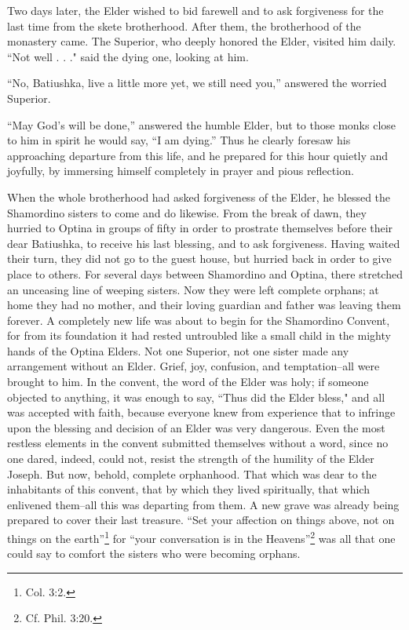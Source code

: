 Two days later, the Elder wished to bid farewell and to ask forgiveness for the last time from the skete brotherhood. After them, the brotherhood of the monastery came. The Superior, who deeply honored the Elder, visited him daily. “Not well . . ." said the dying one, looking at him.

“No, Batiushka, live a little more yet, we still need you,” answered the worried Superior.

“May God's will be done,” answered the humble Elder, but to those monks close to him in spirit he would say, “I am dying.” Thus he clearly foresaw his approaching departure from this life, and he prepared for this hour quietly and joyfully, by immersing himself completely in prayer and pious reflection.

When the whole brotherhood had asked forgiveness of the Elder, he blessed the Shamordino sisters to come and do likewise. From the break of dawn, they hurried to Optina in groups of fifty in order to prostrate themselves before their dear Batiushka, to receive his last blessing, and to ask forgiveness. Having waited their turn, they did not go to the guest house, but hurried back in order to give place to others. For several days between Shamordino and Optina, there stretched an unceasing line of weeping sisters. Now they were left complete orphans; at home they had no mother, and their loving guardian and father was leaving them forever. A completely new life was about to begin for the Shamordino Convent, for from its foundation it had rested untroubled like a small child in the mighty hands of the Optina Elders. Not one Superior, not one sister made any arrangement without an Elder. Grief, joy, confusion, and temptation--all were brought to him. In the convent, the word of the Elder was holy; if someone objected to anything, it was enough to say, “Thus did the Elder bless," and all was accepted with faith, because everyone knew from experience that to infringe upon the blessing and decision of an Elder was very dangerous. Even the most restless elements in the convent submitted themselves without a word, since no one dared, indeed, could not, resist the strength of the humility of the Elder Joseph. But now, behold, complete orphanhood. That which was dear to the inhabitants of this convent, that by which they lived spiritually, that which enlivened them--all this was departing from them. A new grave was already being prepared to cover their last treasure. “Set your affection on things above, not on things on the earth''\footnote{Col. 3:2.} for “your conversation is in the Heavens”\footnote{Cf. Phil. 3:20.} was all that one could say to comfort the sisters who were becoming orphans.

